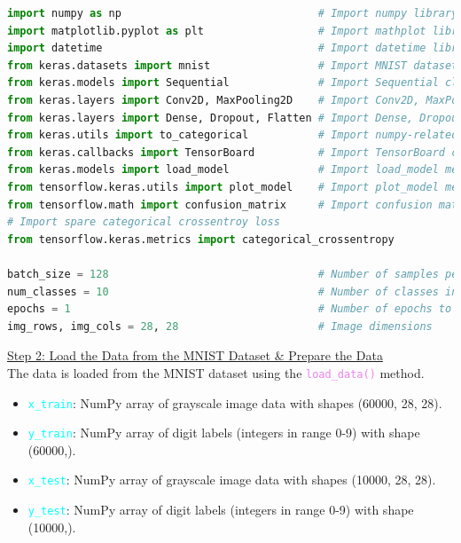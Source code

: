 \documentclass{book}
\begin{document}
\begin{lstlisting}[language=Python, basicstyle=\ttfamily\small, keywordstyle=\color{blue}, commentstyle=\color{forestgreen}, stringstyle=\color{red}, showstringspaces=false]
import numpy as np                               # Import numpy library
import matplotlib.pyplot as plt                  # Import mathplot library
import datetime                                  # Import datetime library
from keras.datasets import mnist                 # Import MNIST dataset
from keras.models import Sequential              # Import Sequential class
from keras.layers import Conv2D, MaxPooling2D    # Import Conv2D, MaxPooling2D class
from keras.layers import Dense, Dropout, Flatten # Import Dense, Dropout, Flatten class
from keras.utils import to_categorical           # Import numpy-related utilities
from keras.callbacks import TensorBoard          # Import TensorBoard class
from keras.models import load_model              # Import load_model method
from tensorflow.keras.utils import plot_model    # Import plot_model method
from tensorflow.math import confusion_matrix     # Import confusion matrix method
# Import spare categorical crossentroy loss
from tensorflow.keras.metrics import categorical_crossentropy

batch_size = 128                                 # Number of samples per gradient update
num_classes = 10                                 # Number of classes in the dataset
epochs = 1                                       # Number of epochs to train the model
img_rows, img_cols = 28, 28                      # Image dimensions
\end{lstlisting}
\newpage
\uline{Step 2: Load the Data from the MNIST Dataset \& Prepare the Data}\\
\vspace{1mm}
The data is loaded from the MNIST dataset using the \textcolor{violet}{\texttt{load\_data()}} method.
\begin{itemize}
    \item \textcolor{cyan}{\texttt{x\_train}}: NumPy array of grayscale image data with shapes (60000, 28, 28).
    \item \textcolor{cyan}{\texttt{y\_train}}: NumPy array of digit labels (integers in range 0-9) with shape (60000,).
    \item \textcolor{cyan}{\texttt{x\_test}}: NumPy array of grayscale image data with shapes (10000, 28, 28).
    \item \textcolor{cyan}{\texttt{y\_test}}: NumPy array of digit labels (integers in range 0-9) with shape (10000,).
\end{itemize}
\end{document}
